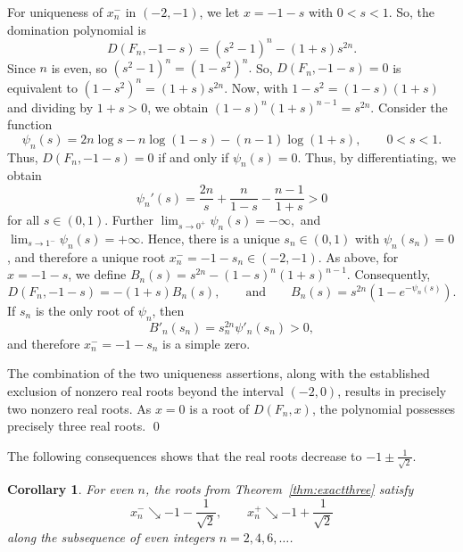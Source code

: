 \documentclass[12pt]{article}
\newtheorem{corollary}[theorem]{Corollary}
\theoremstyle{definition}
\renewenvironment{proof}{{\noindent\bfseries Proof.}}{\qed}
\begin{document}
\begin{proof}
		\medskip
		For uniqueness of $x_n^- $ in $(-2,-1)$, we let $x=-1-s $ with $ 0<s<1.$ So, the domination polynomial is
		$$
		D(F_n,-1-s)=(s^2-1)^n-(1+s)s^{2n}.
		$$
		Since $n$ is even, so $	(s^2-1)^n=(1-s^2)^n.$ So, $D(F_n,-1-s)=0$ is equivalent to $ (1-s^2)^n=(1+s)s^{2n}.$ 
		Now, with $1-s^2=(1-s)(1+s)$ and dividing by $1+s>0$, we obtain $(1-s)^n(1+s)^{n-1}=s^{2n}.$ Consider the function
		$$
		\psi_n(s)=2n\log s-n\log(1-s)-(n-1)\log(1+s), \qquad 0<s<1.
		$$
		Thus, $D(F_n,-1-s)=0$ if and only if $\psi_n(s)=0$. Thus, by differentiating, we obtain
		$$
		\psi_n'(s)=\frac{2n}{s}+\frac{n}{1-s}-\frac{n-1}{1+s}>0
		$$
		for all $s\in(0,1)$. Further $\lim_{s\to 0^+}\psi_n(s)=-\infty, $ and $ \lim_{s\to 1^-}\psi_n(s)=+\infty. $
		Hence, there is a unique $s_n\in(0,1)$ with $\psi_n(s_n)=0$, and therefore a unique root
		$
		x_n^-=-1-s_n\in(-2,-1).
		$
		As above, for \( x = -1 - s \), we define $ B_n(s) =s^{2n} - (1-s)^n(1+s)^{n-1}. $ Consequently, \[ D(F_n, -1 - s) = -(1+s)B_n(s), \qquad  \text{and} \qquad B_n(s) = s^{2n}(1 - e^{-\psi_n(s)}). \] If \( s_n \) is the only root of \( \psi_n \), then \[ B'_n(s_n) = s_n^{2n}\psi'_n(s_n) > 0, \] and therefore $ x_n^{-} = -1 - s_n $ is a simple zero.
		\medskip
		
		The combination of the two uniqueness assertions, along with the established exclusion of nonzero real roots beyond the interval $(-2,0)$, results in precisely two nonzero real roots. As $x=0$ is a root of $D(F_n,x)$, the polynomial possesses precisely three real roots.
	\end{proof}
	
	The following consequences shows that the real roots decrease to $-1\pm\frac{1}{\sqrt2}.$
	\begin{corollary}
		\label{cor:monotone}
		For even $n$, the roots from Theorem~\ref{thm:exactthree} satisfy
		$$
		x_n^- \searrow -1-\frac{1}{\sqrt2},
		\qquad
		x_n^+ \searrow -1+\frac{1}{\sqrt2}
		$$
		along the subsequence of even integers $n=2,4,6,\dots$.
	\end{corollary}
	
\end{document}
